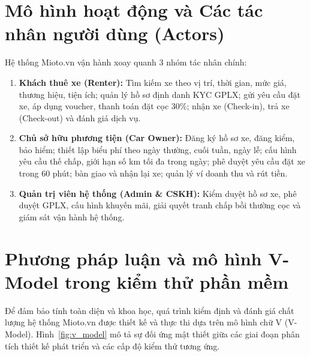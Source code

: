 \documentclass[12pt,a4paper,oneside]{report}
\begin{document}
\section{Mô hình hoạt động và Các tác nhân người dùng (Actors)}
Hệ thống Mioto.vn vận hành xoay quanh 3 nhóm tác nhân chính:
\begin{enumerate}
  \item \textbf{Khách thuê xe (Renter):} Tìm kiếm xe theo vị trí, thời gian, mức giá, thương hiệu, tiện ích; quản lý hồ sơ định danh KYC GPLX; gửi yêu cầu đặt xe, áp dụng voucher, thanh toán đặt cọc 30\%; nhận xe (Check-in), trả xe (Check-out) và đánh giá dịch vụ.
  \item \textbf{Chủ sở hữu phương tiện (Car Owner):} Đăng ký hồ sơ xe, đăng kiểm, bảo hiểm; thiết lập biểu phí theo ngày thường, cuối tuần, ngày lễ; cấu hình yêu cầu thế chấp, giới hạn số km tối đa trong ngày; phê duyệt yêu cầu đặt xe trong 60 phút; bàn giao và nhận lại xe; quản lý ví doanh thu và rút tiền.
  \item \textbf{Quản trị viên hệ thống (Admin \& CSKH):} Kiểm duyệt hồ sơ xe, phê duyệt GPLX, cấu hình khuyến mãi, giải quyết tranh chấp bồi thường cọc và giám sát vận hành hệ thống.
\end{enumerate}

\section{Phương pháp luận và mô hình V-Model trong kiểm thử phần mềm}
Để đảm bảo tính toàn diện và khoa học, quá trình kiểm định và đánh giá chất lượng hệ thống Mioto.vn được thiết kế và thực thi dựa trên mô hình chữ V (V-Model). Hình~\ref{fig:v_model} mô tả sự đối ứng mật thiết giữa các giai đoạn phân tích thiết kế phát triển và các cấp độ kiểm thử tương ứng.
\end{document}
